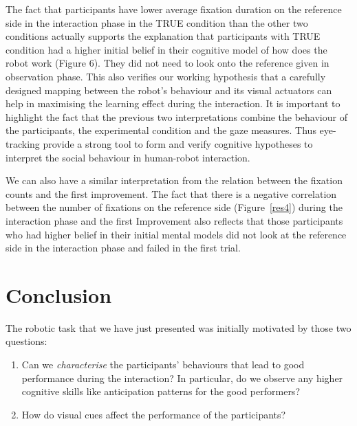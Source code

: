 \documentclass{sig-alternate}
\begin{document}
The fact that participants have lower average fixation duration on the
reference side in the interaction phase in the {\sf TRUE} condition than the
other two conditions actually supports the explanation that participants
with {\sf TRUE} condition had a higher initial belief in their cognitive model
of how does the robot work (Figure 6). They did not need to look onto
the reference given in observation phase. This also verifies our working
hypothesis that a carefully designed mapping between the robot's
behaviour and its visual actuators can help in maximising the learning
effect during the interaction. It is important to highlight the fact that the previous two interpretations combine the behaviour of the participants, the experimental condition and the gaze measures. Thus eye-tracking provide a strong tool to form and verify cognitive hypotheses to interpret the social behaviour in human-robot interaction.

We can also have a similar interpretation from the relation between the fixation counts and the first improvement. The fact that there is a negative correlation  between the number of
fixations on the reference side (Figure~\ref{res4}) during the interaction phase
and the first Improvement also reflects that those participants who had higher belief in their initial mental models did not look at the reference side in the interaction phase and failed in the first trial. 

\addtolength{\textheight}{-7cm}


\section{Conclusion}
\label{conclusion}

The robotic task that we have just presented was initially motivated by those
two questions:

\begin{enumerate}
    \item Can we \emph{characterise} the participants' behaviours that
        lead to good performance during the interaction? In particular, do
        we observe any higher cognitive skills like anticipation patterns for
        the good performers?

    \item How do visual cues affect the performance of the participants?

\end{enumerate}
\end{document}
